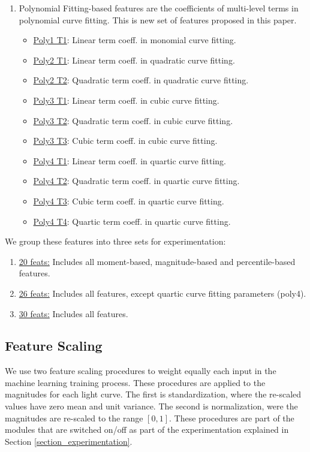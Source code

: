 \documentclass[a4paper,fleqn,usenatbib]{mnras}
\begin{document}
\begin{enumerate}
  \item Polynomial Fitting-based features are the coefficients of
    multi-level terms in polynomial curve fitting. This is new set
    of features proposed in this paper. 
    \begin{itemize}
        \item \underline{Poly1 T1}: Linear term coeff. in monomial curve fitting.
        \item \underline{Poly2 T1}: Linear term coeff. in quadratic curve fitting.
        \item \underline{Poly2 T2}: Quadratic term coeff. in quadratic curve fitting.
        \item \underline{Poly3 T1}: Linear term coeff. in cubic curve fitting.
        \item \underline{Poly3 T2}: Quadratic term coeff. in cubic curve fitting.
        \item \underline{Poly3 T3}: Cubic term coeff. in cubic curve fitting.
        \item \underline{Poly4 T1}: Linear term coeff. in quartic curve fitting.
        \item \underline{Poly4 T2}: Quadratic term coeff. in quartic curve fitting.
        \item \underline{Poly4 T3}: Cubic term coeff. in quartic curve fitting.
        \item \underline{Poly4 T4}: Quartic term coeff. in quartic curve fitting.
    \end{itemize}    
\end{enumerate}

We group these features into three sets for experimentation:

\begin{enumerate}
\item \underline{20 feats:} Includes all moment-based, magnitude-based
  and percentile-based features.  
\item \underline{26 feats:} Includes all features, except quartic
  curve fitting parameters (poly4). 
\item \underline{30 feats:} Includes all features.
\end{enumerate}


\subsection{Feature Scaling} \label{subsection_scaling}

We use two feature scaling procedures to weight equally each input
in the machine learning training process.
These procedures are applied to the magnitudes for each light curve.
The first is standardization, where the re-scaled values have zero mean and unit variance. 
The second is normalization, were the magnitudes are re-scaled  to the
range $[0,1]$. 
These procedures are part of the modules that are switched on/off as
part of the experimentation explained in Section \ref{section_experimentation}.
\end{document}
